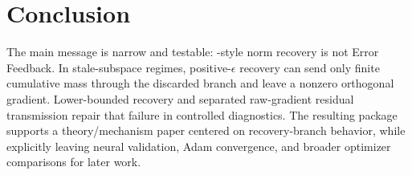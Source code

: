 \section{Conclusion}

The main message is narrow and testable: \Fira-style norm recovery is not Error
Feedback. In stale-subspace regimes, positive-$\epsilon$ recovery can send only
finite cumulative mass through the discarded branch and leave a nonzero
orthogonal gradient. Lower-bounded recovery and separated raw-gradient residual
transmission repair that failure in controlled diagnostics. The resulting
package supports a theory/mechanism paper centered on recovery-branch behavior,
while explicitly leaving neural validation, Adam convergence, and broader
optimizer comparisons for later work.
